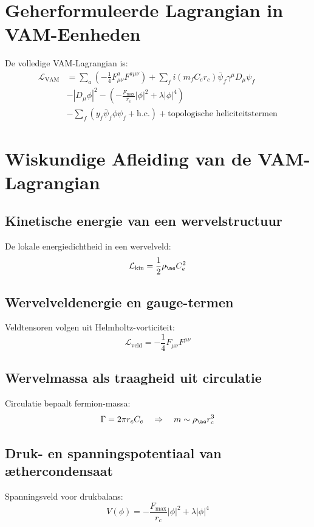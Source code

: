 \documentclass{article}
\begin{document}
    \section{Geherformuleerde Lagrangian in VAM-Eenheden}
    De volledige VAM-Lagrangian is:
    \begin{align*}
        \mathcal{L}_{\text{VAM}} &= \sum_{a}\left(-\frac{1}{4} F^{a}_{\mu\nu} F^{a\mu\nu}\right)
        + \sum_{f} i(m_f C_e r_c)\bar{\psi}_f \gamma^\mu D_\mu \psi_f \\
        &- \left| D_\mu \phi \right|^2
        - \left(-\frac{F_{\text{max}}}{r_c}|\phi|^2 + \lambda|\phi|^4\right) \\
        &- \sum_f \left(y_f \bar{\psi}_f \phi \psi_f + \text{h.c.}\right)
        + \text{topologische heliciteitstermen}
    \end{align*}

    \section{Wiskundige Afleiding van de VAM-Lagrangian}

    \subsection{Kinetische energie van een wervelstructuur}
    De lokale energiedichtheid in een wervelveld:
    \[
        \mathcal{L}_{\text{kin}} = \frac{1}{2}\rho_{\ae} C_e^2
    \]

    \subsection{Wervelveldenergie en gauge-termen}
    Veldtensoren volgen uit Helmholtz-vorticiteit:
    \[
        \mathcal{L}_{\text{veld}} = -\frac{1}{4}F_{\mu\nu}F^{\mu\nu}
    \]

    \subsection{Wervelmassa als traagheid uit circulatie}
    Circulatie bepaalt fermion-massa:
    \[
        \Gamma = 2\pi r_c C_e \quad\Rightarrow\quad m \sim \rho_{\ae} r_c^3
    \]

    \subsection{Druk- en spanningspotentiaal van æthercondensaat}
    Spanningsveld voor drukbalans:
    \[
        V(\phi) = -\frac{F_{\text{max}}}{r_c}|\phi|^2 + \lambda|\phi|^4
    \]
\end{document}
